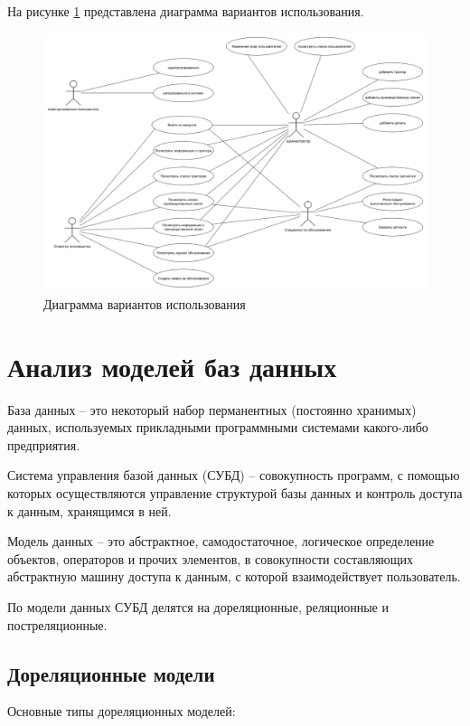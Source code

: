 На рисунке \ref{img:use-case} представлена диаграмма вариантов использования.

\begin{figure}[H]
    \centering
    \includegraphics[width=1\textwidth]{inc/img/use-case.png}
    \caption{Диаграмма вариантов использования}
    \label{img:use-case}
\end{figure}

\section{Анализ моделей баз данных}

База данных -- это некоторый набор перманентных (постоянно хранимых) данных, используемых прикладными программными системами какого-либо предприятия\cite{дейт2001введение}. 

Система управления базой данных (СУБД) -- совокупность программ, с помощью которых осуществляются управление структурой базы данных и контроль доступа к данным, хранящимся в ней\cite{роб2004системы}.

Модель данных -- это абстрактное, самодостаточное, логическое определение объектов, операторов и прочих элементов, в совокупности составляющих абстрактную машину доступа к данным, с которой взаимодействует пользователь\cite{дейт2001введение}.

По модели данных СУБД делятся на дореляционные, реляционные и постреляционные.

\subsection{Дореляционные модели}

Основные типы дореляционных моделей\cite{дейт2001введение}:

